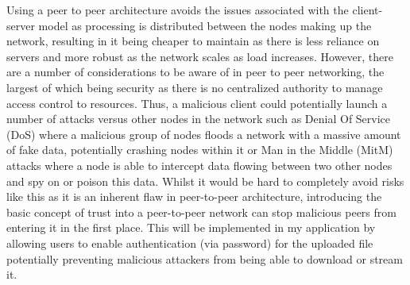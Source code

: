 \documentclass[]{report}
\begin{document}
	Using a peer to peer architecture avoids the issues associated with the client-server model as processing is distributed between the nodes making up the network, resulting in it being cheaper to maintain as there is less reliance on servers and more robust as the network scales as load increases. However, there are a number of considerations to be aware of in peer to peer networking, the largest of which being security as there is no centralized authority to manage access control to resources. Thus, a malicious client could potentially launch a number of attacks versus other nodes in the network such as Denial Of Service (DoS) where a malicious group of nodes floods a network with a massive amount of fake data, potentially crashing nodes within it or Man in the Middle (MitM) attacks where a node is able to intercept data flowing between two other nodes and spy on or poison this data\cite{P2P Security Issues}. Whilst it would be hard to completely avoid risks like this as it is an inherent flaw in peer-to-peer architecture, introducing the basic concept of trust into a peer-to-peer network can stop malicious peers from entering it in the first place. This will be implemented in my application by allowing users to enable authentication (via password) for the uploaded file potentially preventing malicious attackers from being able to download or stream it. 
	
\end{document}
